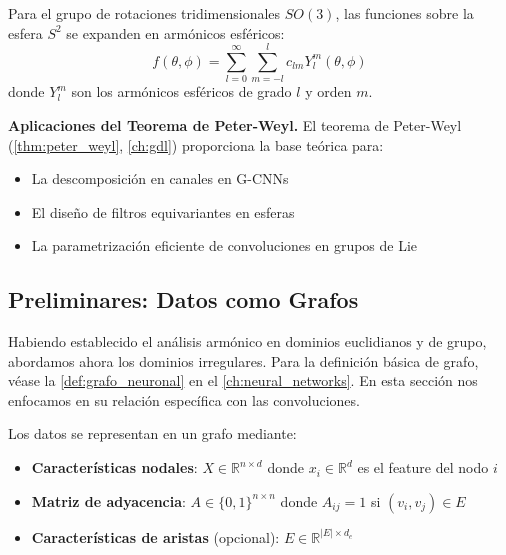 \begin{definition}\label{def:armonicos_esfericos}
Para el grupo de rotaciones tridimensionales $SO(3)$, las funciones sobre la esfera $S^2$ se expanden en armónicos esféricos:
\begin{equation}
f(\theta, \phi) = \sum_{l=0}^{\infty} \sum_{m=-l}^{l} c_{lm} Y_l^m(\theta, \phi)
\end{equation}
donde $Y_l^m$ son los armónicos esféricos de grado $l$ y orden $m$.
\end{definition}

\textbf{Aplicaciones del Teorema de Peter-Weyl.} El teorema de Peter-Weyl (\autoref{thm:peter_weyl}, \autoref{ch:gdl}) proporciona la base teórica para:
\begin{itemize}
    \item La descomposición en canales en G-CNNs
    \item El diseño de filtros equivariantes en esferas
    \item La parametrización eficiente de convoluciones en grupos de Lie
\end{itemize}

\subsection{Preliminares: Datos como Grafos}\label{subsec:preliminares_grafos_cnn}

Habiendo establecido el análisis armónico en dominios euclidianos y de grupo, abordamos ahora los dominios irregulares. Para la definición básica de grafo, véase la \autoref{def:grafo_neuronal} en el \autoref{ch:neural_networks}. En esta sección nos enfocamos en su relación específica con las convoluciones.

\begin{definition}\label{def:representacion_datos_grafos}
Los datos se representan en un grafo mediante:
\begin{itemize}
	\item \textbf{Características nodales}: \(X \in \mathbb{R}^{n \times d}\) donde \(x_i \in \mathbb{R}^d\) es el feature del nodo \(i\)
	\item \textbf{Matriz de adyacencia}: \(A \in \{0,1\}^{n \times n}\) donde \(A_{ij} = 1\) si \((v_i, v_j) \in E\)
	\item \textbf{Características de aristas} (opcional): \(E \in \mathbb{R}^{|E| \times d_e}\)
\end{itemize}
\end{definition}

